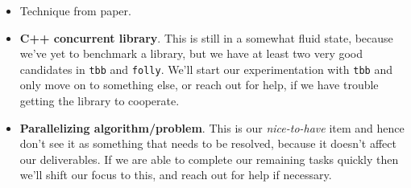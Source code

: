 \documentclass[11pt]{article}
\begin{document}
\begin{itemize}
\item
Technique from paper.
\item
{\bf C++ concurrent library}. This is still in a somewhat fluid state, because
we've yet to benchmark a library, but we have at least two very good candidates
in {\tt tbb} and {\tt folly}. We'll start our experimentation with {\tt tbb} and
only move on to something else, or reach out for help, if we have trouble
getting the library to cooperate.
\item
{\bf Parallelizing algorithm/problem}. This is our {\it nice-to-have} item and
hence don't see it as something that needs to be resolved, because it doesn't
affect our deliverables. If we are able to complete our remaining tasks quickly
then we'll shift our focus to this, and reach out for help if necessary.
\end{itemize}

\printbibliography
\end{document}
